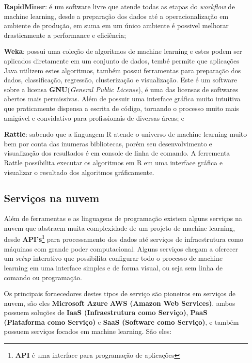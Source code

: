 \begin{alineas}
	\item \textbf{RapidMiner}: é um software livre que atende todas as etapas do \textit{workflow} de machine learning, desde a preparação dos dados até 
	a operacionalização em ambiente de produção, em suma em um único ambiente é possivel melhorar drasticamente a performance e eficiência;

	\item \textbf{Weka}: possui uma coleção de algoritmos de machine learning e estes podem ser aplicados diretamente em um conjunto de dados, tembé permite
	que aplicações Java utilizem estes algoritmos, também possui ferramentas para preparação dos dados, classificação, regressão, clusterização e visualização.
	Este é um software sobre a licensa \textbf{GNU}(\textit{General Public License}), é uma das licensas de softwares abertos mais permissivas. 
	Além de possuir uma interface gráfica muito intuitiva que praticamente dispensa a escrita de código, tornando o processo muito mais amigável e
	convidativo para profissionais de diversas áreas; e

	\item \textbf{Rattle}: sabendo que a linguagem R atende o universo de machine learning muito bem por conta das inumeras bibliotecas, porém 
	seu desenvolvimento e visualização dos resultados é em console de linha de comando. A ferrementa Rattle possibilita executar os algoritmos
	em R em uma interface gráfica e visualizar o resultado dos algoritmos gráficamente.	  
\end{alineas}


\subsection{Serviços na nuvem}
\label{subsec:servicos}
Além de ferramentas e as linguagens de programação existem alguns serviços na nuvem que abstraem muita complexidade de um projeto de machine learning, 
desde \textbf{API's}\footnote{\textbf{API} é uma interface para programação de aplicações} para processamento dos dados até serviços de infraestrutura como máquinas com grande poder computacional.
Alguns serviços chegam a oferecer um \textit{setup} interativo que possibilita configurar todo o processo de machine learning em uma interface
simples e de forma visual, ou seja sem linha de comando ou programação.


Os principais fornecedores destes tipos de serviço são pioneiros em serviços de nuvem, são eles \textbf{Microsoft Azure} \textbf{AWS (Amazon Web Services)}, 
ambos possuem soluções de \textbf{IaaS (Infraestrutura como Serviço)}, \textbf{PaaS (Plataforma como Serviço)} e \textbf{SaaS (Software como Serviço)}, e também
possuem serviços focados em machine learning. São eles:

